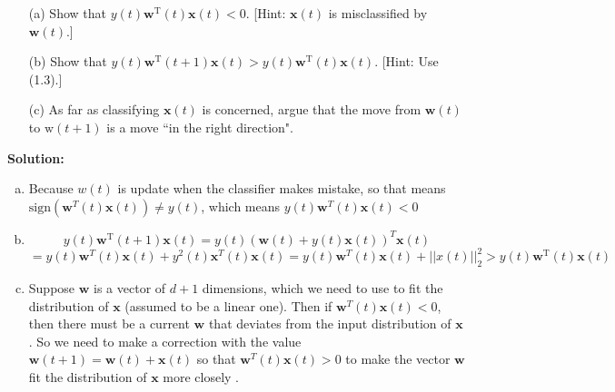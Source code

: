 \documentclass[10pt]{article}
\begin{document}
\begin{enumerate}[1.]
                
		\begin{itemize}
			\item[(a)] Show that $y(t) \mathbf{w}^{\mathrm{T}}(t) \mathbf{x}(t)<0$. [Hint: $\mathbf{x}(t)$ is misclassified by $\mathbf{w}(t)$.]~ 
			\item[(b)] Show that $y(t) \mathbf{w}^{\mathrm{T}}(t+1) \mathbf{x}(t)>y(t) \mathbf{w}^{\mathrm{T}}(t) \mathbf{x}(t)$. [Hint: Use (1.3).]~ 
			\item[(c)]   As far as classifying $\mathbf{x}(t)$ is concerned, argue that the move from $\mathbf{w}(t)$ to $\mathrm{w}(t+1)$ is a move ``in the right direction".~ 
		\end{itemize}

		\textbf{Solution:}
        \begin{enumerate}[(a)]
            \item 
            Because $w(t)$ is update when the classifier makes mistake, so that means $\mbox{sign}(\mathbf{w}^T(t)\mathbf{x}(t))\neq y(t)$, which means $y(t)\mathbf{w}^T(t)\mathbf{x}(t)<0$
            \item 
            $$y(t) \mathbf{w}^{\mathrm{T}}(t+1) \mathbf{x}(t)=y(t)(\mathbf{w}(t)+y(t)\mathbf{x}(t))^T\mathbf{x}(t)$$
            $$=y(t)\mathbf{w}^T(t)\mathbf{x}(t)+y^2(t)\mathbf{x}^T(t)\mathbf{x}(t)=y(t)\mathbf{w}^T(t)\mathbf{x}(t)+||x(t)||_2^2>y(t) \mathbf{w}^{\mathrm{T}}(t) \mathbf{x}(t)$$
            \item 
            Suppose $\mathbf{w}$ is a vector of $d+1$ dimensions, which we need to use to fit the distribution of $\mathbf{x}$ (assumed to be a linear one). Then if $\mathbf{w}^T(t)\mathbf{x}(t)<0$, then there must be a current $\mathbf{w}$ that deviates from the input distribution of $\mathbf{x}$. So we need to make a correction with the value $\mathbf{w}(t+1)=\mathbf{w}(t)+\mathbf{x}(t)$ so that $\mathbf{w}^T(t)\mathbf{x}(t)>0$ to make the vector $\mathbf{w}$ fit the distribution of $\mathbf{x}$ more closely .
       \end{enumerate}

\end{enumerate}
\end{document}
